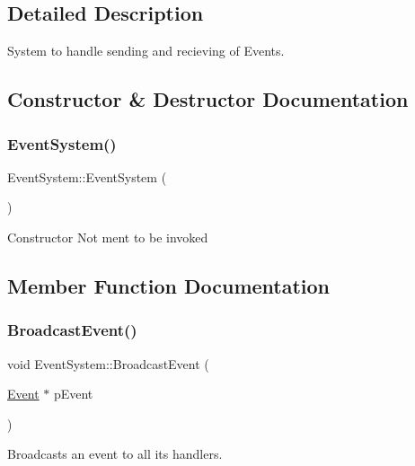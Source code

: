 \subsection{Detailed Description}
System to handle sending and recieving of Events. 

\subsection{Constructor \& Destructor Documentation}
\mbox{\label{class_event_system_a461a525365e056375c1e4177897688ed}} 
\subsubsection{\texorpdfstring{Event\+System()}{EventSystem()}}
{\footnotesize\ttfamily Event\+System\+::\+Event\+System (\begin{DoxyParamCaption}{ }\end{DoxyParamCaption})\hspace{0.3cm}{\ttfamily [delete]}}

Constructor Not ment to be invoked 

\subsection{Member Function Documentation}
\mbox{\label{class_event_system_ae7f287c5ee2c8001e19467ae8fda8a67}} 
\subsubsection{\texorpdfstring{Broadcast\+Event()}{BroadcastEvent()}}
{\footnotesize\ttfamily void Event\+System\+::\+Broadcast\+Event (\begin{DoxyParamCaption}\item[{\mbox{\hyperlink{struct_event}{Event}} $\ast$}]{p\+Event }\end{DoxyParamCaption})\hspace{0.3cm}{\ttfamily [static]}}



Broadcasts an event to all its handlers. 


